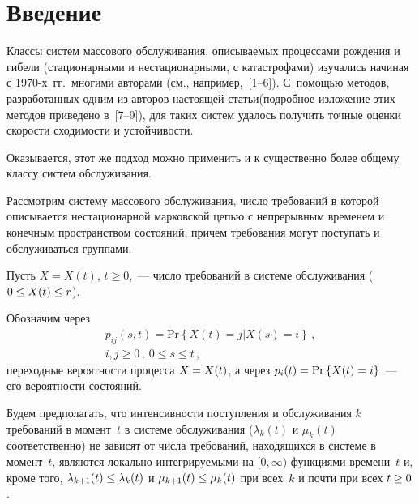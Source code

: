       \begin{multicols}{2}
      
            \label{st\stat}

\section{Введение}

Классы систем массового обслуживания, описываемых процессами
рождения и гибели (стационарными и нестационарными, с катастрофами)
изучались начиная с 1970-х~гг.\ многими авторами
(см., например,~[1--6]). С~помощью методов,
разработанных одним из авторов настоящей \mbox{статьи}\linebreak (подробное изложение
этих методов приведено в~[7--9]), для таких сис\-тем
удалось получить точные оценки скорости сходимости и устойчивости.

Оказывается, этот же подход можно применить и к существенно более 
общему классу систем обслуживания.

Рассмотрим систему массового обслуживания, число требований в которой 
описывается нестационарной марковской цепью с непрерывным временем и 
конечным пространством состояний, причем требования могут поступать и 
обслуживаться группами.

Пусть $X=X(t)$, $t\geq 0$,~--- число требований в системе обслуживания ($0 \hm\le X(t) \hm\le r$).

Обозначим через 
\begin{gather*}
p_{ij}(s,t)=\mathrm{Pr}\left\{ X(t)=j\left| X(s)=i\right.
\right\}\,,\\
i,j \ge 0\,,\ 0\leq s\leq t\,,
\end{gather*}
переходные вероятности
процесса $X\hm=X(t)$, а через  $p_i(t)\hm=\mathrm{Pr}\left\{ X(t) \hm=i \right\}$~---
его вероятности состояний.

Будем предполагать, что интенсивности поступления и обслуживания $k$ требований в 
момент~$t$ в сис\-те\-ме об\-слу\-жи\-ва\-ния ($\lambda_{k}(t)$ и  $\mu_{k}(t)$ соответственно)  
не зависят от числа требований, находящихся в системе в момент~$t$, являются локально 
интегрируемыми на $[0,\infty)$ функциями времени~$t$ и, кроме того, 
$\lambda_{k+1}(t) \hm\le \lambda_{k}(t)$ и  $\mu_{k+1}(t) \hm\le \mu_{k}(t)$ при всех~$k$ 
и почти при всех $t \hm\ge 0$.


\end{multicols}
